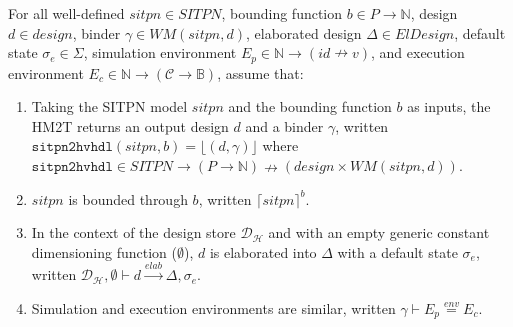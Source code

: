 \documentclass[dvipsnames,12pt]{article}
\begin{document}
\begin{definition}[HM2T hypotheses]
  \label{def:hm2t-hyps}
  For all well-defined $sitpn\in{}SITPN$, bounding function
  $b\in{}P\rightarrow\mathbb{N}$, \hvhdl{} design $d\in{}design$,
  binder $\gamma\in{}WM(sitpn,d)$, elaborated design
  $\Delta\in{}ElDesign$, default state $\sigma_e\in\Sigma$, simulation
  environment $E_p\in\mathbb{N}\rightarrow{}(id\nrightarrow{}v)$, and
  execution environment
  $E_c\in\mathbb{N}\rightarrow(\mathcal{C}\rightarrow\mathbb{B})$,
  assume that:
  \begin{enumerate}
  \item\label{it:HM2T-some} Taking the SITPN model $sitpn$ and the
    bounding function $b$ as inputs, the HM2T returns an output design
    $d$ and a binder $\gamma$, written
    $\mathtt{sitpn2hvhdl}(sitpn, b)=\lfloor(d,\gamma)\rfloor$ where
    $\mathtt{sitpn2hvhdl}\in{}SITPN\rightarrow(P\rightarrow\mathbb{N})\nrightarrow(design\times{}WM(sitpn,d))$.
  \item\label{it:sitpn-is-bounded} $sitpn$ is bounded through $b$,
    written $\lceil{}sitpn\rceil^b$.
  \item In the context of the \hilecop{} design store
    $\mathcal{D}_\mathcal{H}$ and with an empty generic constant
    dimensioning function ($\emptyset$), $d$ is elaborated into
    $\Delta$ with a default state $\sigma_e$, written
    $\mathcal{D}_\mathcal{H},\emptyset\vdash{}d\xrightarrow{elab}\Delta,\sigma_e$.
  \item\label{it:env-are-sim} Simulation and execution environments
    are similar, written $\gamma\vdash{}E_p\stackrel{env}{=}E_c$.
  \end{enumerate}
  
\end{definition}

\def\hm2thyps{well-defined $sitpn\in{}SITPN$,
  $b\in{}P\rightarrow\mathbb{N}$, $d\in{}design$,
  $\gamma\in{}WM(sitpn,d)$, $\Delta\in{}ElDesign,\sigma_{e}\in\Sigma$,
  $E_p\in\mathbb{N}\rightarrow{}(id\nrightarrow{}v)$, and
  $E_c\in\mathbb{N}\rightarrow(\mathcal{C}\rightarrow\mathbb{B})$ that
  verify the hypotheses of Definition~\ref{def:hm2t-hyps}}
\end{document}
